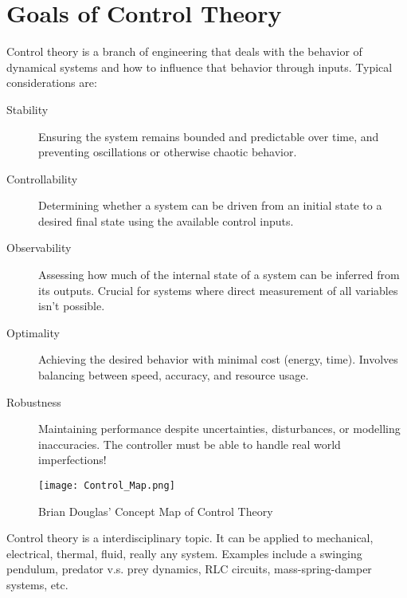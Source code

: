 \documentclass[../notes.tex]{subfiles}
\begin{document}
\section{Goals of Control Theory}
Control theory is a branch of engineering that deals with the behavior of dynamical systems and how to influence that behavior through inputs. Typical considerations are:
\begin{description}
    \item[Stability] Ensuring the system remains bounded and predictable over time, and preventing oscillations or otherwise chaotic behavior.
    \item[Controllability] Determining whether a system can be driven from an initial state to a desired final state using the available control inputs.
    \item[Observability] Assessing how much of the internal state of a system can be inferred from its outputs. Crucial for systems where direct measurement of all variables isn't possible.
    \item[Optimality] Achieving the desired behavior with minimal cost (energy, time). Involves balancing between speed, accuracy, and resource usage.
    \item[Robustness] Maintaining performance despite uncertainties, disturbances, or modelling inaccuracies. The controller must be able to handle real world imperfections!
\end{description}

\begin{figure}[H]
    \centering
    \texttt{[image: Control\_Map.png]}
    \caption{Brian Douglas' Concept Map of Control Theory}
    \label{fig:controlMap}
\end{figure}

Control theory is a interdisciplinary topic. It can be applied to mechanical, electrical, thermal, fluid, really any system. Examples include a swinging pendulum, predator v.s. prey dynamics, RLC circuits, mass-spring-damper systems, etc.
\end{document}
